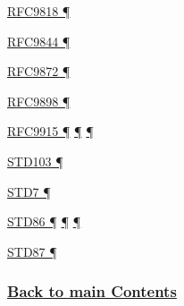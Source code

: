 \documentclass[
]{article}
\begin{document}
\hyperref[prefix-per-host]{RFC9818 ¶}

\hyperref[addresses]{RFC9844 ¶}

\hyperref[translation-and-ipv4-as-a-service]{RFC9872 ¶}

\hyperref[address-resolution]{RFC9898 ¶}

\hyperref[managed-configuration]{RFC9915 ¶}
\hyperref[address-planning]{¶} \hyperref[prefix-per-host]{¶}

\hyperref[translation-and-ipv4-as-a-service]{STD103 ¶}

\hyperref[transport-protocols]{STD7 ¶}

\hyperref[ipv6-basic-technology]{STD86 ¶}
\hyperref[extension-headers-and-options]{¶} \hyperref[markdown-usage]{¶}

\hyperref[extension-headers-and-options]{STD87 ¶}

\subsubsection{\texorpdfstring{\hyperref[list-of-contents]{Back to main
Contents}}{Back to main Contents}}\label{back-to-main-contents-13}

\pagebreak
\end{document}
